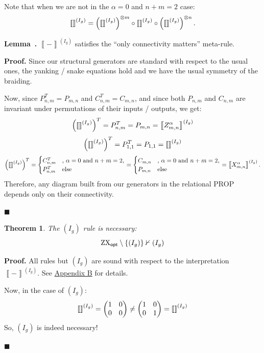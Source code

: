 \documentclass[copyright,creativecommons]{eptcs}
\newcommand{\typedfig}[1]{\IfFileExists{latex_typed/b_rule_note/figures/#1.tikz}{}{}}
\newcommand{\tombstone}{\par\nobreak\hfill\ensuremath{\blacksquare}}
\newcommand{\zxfig}[1]{\vcenter{\hbox{\scalebox{1}{\typedfig{#1}}}}}
\newcommand{\zxopt}{\ensuremath{\textup{ZX}_{\textsf{opt}}}\xspace}
\newcommand{\sem}[1]{\left\llbracket #1 \right\rrbracket}
\newtheorem{theorem}{Theorem}[section]
\theoremstyle{definition}
\theoremstyle{remark}
\begin{document}
Note that when we are not in the \(\alpha=0\) and \(n+m=2\) case:
\[
\sem{\zxfig{rn-alpha}}^{(I_g)}=
\left(\sem{\zxfig{Hadamard}}^{(I_g)}\right)^{\otimes m}
\circ \sem{\zxfig{gn-alpha}}^{(I_g)}
\circ \left(\sem{\zxfig{Hadamard}}^{(I_g)}\right)^{\otimes n}.
\]

\bigskip

\noindent\textbf{Lemma~\thetheorem.} \(\sem{-}^{(I_g)}\) satisfies the ``only connectivity
matters'' meta-rule.

\medskip

\noindent\textbf{Proof.} Since our structural generators are
standard with respect to the usual ones,
the yanking / snake equations hold and
we have the usual symmetry of the braiding.

Now, since \(P_{n,m}^T=P_{m,n}\) and \(C_{n,m}^T=C_{m,n}\), and since both \(P_{n,m}\) and \(C_{n,m}\) are invariant
under permutations of their inputs / outputs, we get:
\[
\left(\sem{\zxfig{gn-alpha}}^{(I_g)}\right)^T
=P_{n,m}^T=P_{m,n}=\sem{Z^\alpha_{m,n}}^{(I_g)}
\]
\[
\left(\sem{\zxfig{Hadamard}}^{(I_g)}\right)^T
=P_{1,1}^T=P_{1,1}=\sem{\zxfig{Hadamard}}^{(I_g)}
\]
\[
\left(\sem{\zxfig{rn-alpha}}^{(I_g)}\right)^T
=
\begin{cases}
C_{n,m}^T & \text{, }\alpha=0\text{ and }n+m=2,\\
P_{n,m}^T & \text{else}
\end{cases}
=
\begin{cases}
C_{m,n} & \text{, }\alpha=0\text{ and }n+m=2,\\
P_{m,n} & \text{else}
\end{cases}
=\sem{X^\alpha_{m,n}}^{(I_g)}.
\]
Therefore, any diagram built from our
generators in the relational PROP depends
only on their connectivity.
\tombstone

\bigskip

\begin{theorem}
\label{thm:ig-rule-necessity}
The \((I_g)\) rule is necessary:
\[
\zxopt\setminus\{(I_g)\}\nvdash (I_g)
\]
\end{theorem}

\noindent\textbf{Proof.} All rules but \((I_g)\) are sound with respect to
the interpretation \(\sem{-}^{(I_g)}\).
See \hyperref[app:ig-rule-soundness-checks]{Appendix B} for details.

Now, in the case of \((I_g)\):
\[
\sem{\zxfig{gn-1-1-zero}}^{(I_g)}
=\begin{pmatrix}1&0\\0&0\end{pmatrix}
\ne
\begin{pmatrix}1&0\\0&1\end{pmatrix}
=\sem{\zxfig{single-line}}^{(I_g)}
\]
So, \((I_g)\) is indeed necessary!
\tombstone
\end{document}
